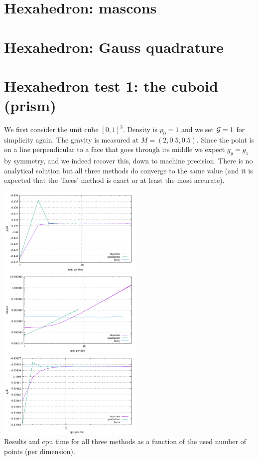 \section*{Hexahedron: mascons}


\section*{Hexahedron: Gauss quadrature}


\section*{Hexahedron test 1: the cuboid (prism)}

We first consider the unit cube $[0,1]^3$. Density is $\rho_0=1$ and 
we set ${\cal G}=1$ for simplicity again.
The gravity is measured at $M=(2,0.5,0.5)$. Since the point is on a line perpendicular 
to a face that goes through its middle we expect $g_y=g_z$ by symmetry, and 
we indeed recover this, down to machine precision.
There is no analytical solution but all three methods do converge to the same value
(and it is expected that the 'faces' method is exact or at least the most accurate).

\begin{center}
\includegraphics[width=7cm]{python_codes/fieldstone_113/results/hex_test1/gx.pdf}
\includegraphics[width=7cm]{python_codes/fieldstone_113/results/hex_test1/time.pdf}\\
\includegraphics[width=7cm]{python_codes/fieldstone_113/results/hex_test1/gx2.pdf}\\
{\captionfont Results and cpu time for all three methods as a function of 
the used number of points (per dimension).}
\end{center}

